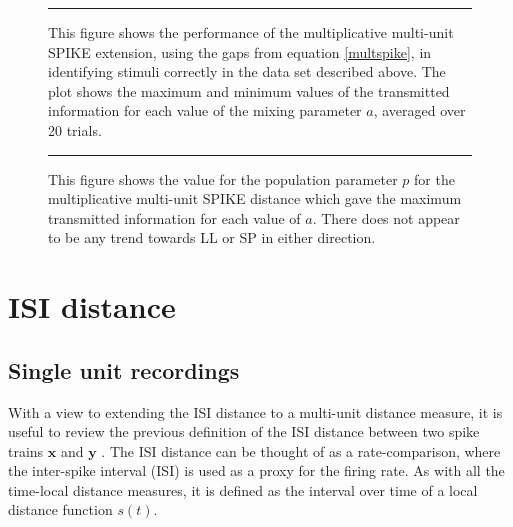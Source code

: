 %
%
\begin{figure}[htb]

\bigskip
\rule{33em}{0.5pt}
\caption{This figure shows the performance of the multiplicative multi-unit SPIKE extension, using the gaps from equation \ref{multspike}, in identifying stimuli correctly in the data set described above.  The plot shows the maximum and minimum values of the transmitted information for each value of the mixing parameter $a$, averaged over 20 trials.}
\end{figure}

\begin{figure}[htb]

\bigskip
\rule{33em}{0.5pt}
\caption{This figure shows the value for the population parameter $p$ for the multiplicative multi-unit SPIKE distance which gave the maximum transmitted information for each value of $a$.  There does not appear to be any trend towards LL or SP in either direction.}
\end{figure}

\newpage
\section{ISI distance}
\bigskip
\subsection{Single unit recordings}

With a view to extending the ISI distance to a multi-unit distance measure, it is useful to review the previous definition of the ISI distance between two spike trains $\mathbf{x}$ and $\mathbf{y}$ .  The ISI distance can be thought of as a rate-comparison, where the inter-spike interval (ISI) is used as a proxy for the firing rate.  As with all the time-local distance measures, it is defined as the interval over time of a local distance function $s(t)$.

